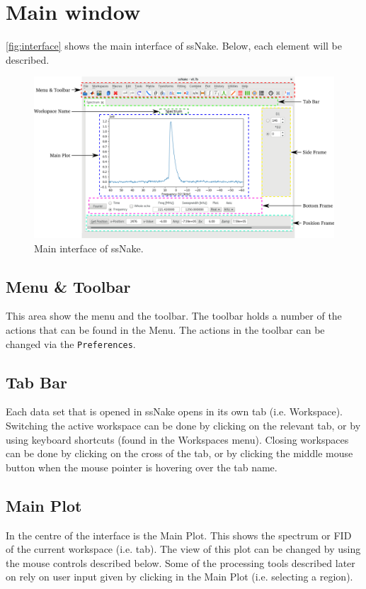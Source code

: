 \documentclass[11pt,a4paper]{article}
\begin{document}
\section{Main window}
\autoref{fig:interface} shows the main interface of ssNake. Below, each element will be described.

\begin{figure}[t]
  \centering
  \includegraphics[width=\linewidth]{Images/Interface.pdf}
  \caption{Main interface of ssNake.}
  \label{fig:interface}
\end{figure}

\subsection{Menu \& Toolbar}
This area show  the menu and the toolbar. The toolbar holds a number of the actions that can be
found in the Menu. The actions in the toolbar can be changed via the \texttt{Preferences}.




\subsection{Tab Bar}
Each data set that is opened in ssNake opens in its own tab (i.e. Workspace). Switching the active
workspace can be done by clicking on the relevant tab, or by using keyboard shortcuts (found in the
Workspaces menu). Closing workspaces can be done by clicking on the cross of the tab, or by clicking
the middle mouse button when the mouse pointer is hovering over the tab name.

\subsection{Main Plot}
In the centre of the interface is the Main Plot. This shows the spectrum or FID of the current
workspace (i.e. tab). The view of this plot can be changed by using the mouse controls described
below. Some of the processing tools described later on rely on user input given by clicking in the
Main Plot (i.e. selecting a region).
\end{document}
